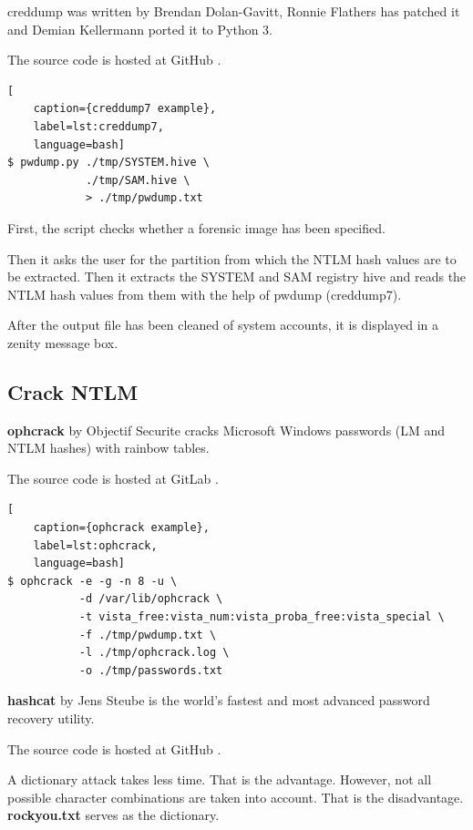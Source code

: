 creddump was written by Brendan Dolan-Gavitt, Ronnie Flathers has patched it and Demian Kellermann ported it to Python 3.

The source code is hosted at GitHub \cite{Creddump}.

\begin{lstlisting}[
    caption={creddump7 example},
    label=lst:creddump7,
    language=bash]
$ pwdump.py ./tmp/SYSTEM.hive \
            ./tmp/SAM.hive \
            > ./tmp/pwdump.txt
\end{lstlisting}

\noindent First, the script checks whether a forensic image has been specified.

Then it asks the user for the partition from which the NTLM hash values are to be extracted. Then it extracts the SYSTEM and SAM registry hive and reads the NTLM hash values from them with the help of pwdump (creddump7).

After the output file has been cleaned of system accounts, it is displayed in a zenity message box.

\subsection{Crack NTLM}

\textbf{ophcrack} by Objectif Securite cracks Microsoft Windows passwords (LM and NTLM hashes) with rainbow tables.

The source code is hosted at GitLab \cite{Ophcrack}.

\begin{lstlisting}[
    caption={ophcrack example},
    label=lst:ophcrack,
    language=bash]
$ ophcrack -e -g -n 8 -u \
           -d /var/lib/ophcrack \
           -t vista_free:vista_num:vista_proba_free:vista_special \
           -f ./tmp/pwdump.txt \
           -l ./tmp/ophcrack.log \
           -o ./tmp/passwords.txt
\end{lstlisting}

\noindent \textbf{hashcat} by Jens Steube is the world's fastest and most advanced password recovery utility.

The source code is hosted at GitHub \cite{Hashcat}.

A dictionary attack takes less time. That is the advantage. However, not all possible character combinations are taken into account. That is the disadvantage.\newline
\newline
\noindent \textbf{rockyou.txt} \cite{Rockyou} serves as the dictionary.

